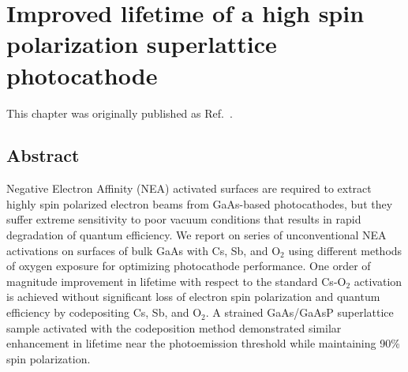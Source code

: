 \chapter{Improved lifetime of a high spin polarization superlattice photocathode}

This chapter was originally published as Ref.~\cite{bae2020_ImprovedLifetimeHigh}.

\section{Abstract}
Negative Electron Affinity (NEA) activated surfaces are required to extract highly spin polarized electron beams from GaAs-based photocathodes, but they suffer extreme sensitivity to poor vacuum conditions that results in rapid degradation of quantum efficiency. We report on series of unconventional NEA activations on surfaces of bulk GaAs with Cs, Sb, and O$_2$ using different methods of oxygen exposure for optimizing photocathode performance. One order of magnitude improvement in lifetime with respect to the standard Cs-O$_2$ activation is achieved without significant loss of electron spin polarization and quantum efficiency by codepositing Cs, Sb, and O$_2$. A strained GaAs/GaAsP superlattice sample activated with the codeposition method demonstrated similar enhancement in lifetime near the photoemission threshold while maintaining 90\% spin polarization.

